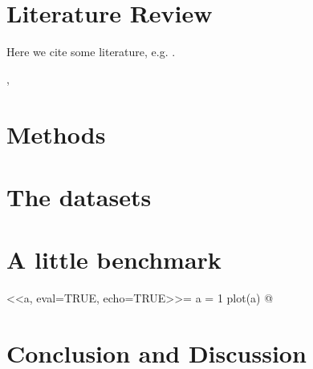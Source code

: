 \documentclass[a4paper]{article}
\begin{document}
\section{Literature Review}
\label{sec:literature}
  
Here we cite some literature, e.g. \citet{Bischl2017}.
  
  \citet{Olson2017},
  \citet{OpenML2013}

  


\section{Methods}

\section{The datasets}
 
\section{A little benchmark}

<<a, eval=TRUE, echo=TRUE>>=
  a = 1
  plot(a)
@

\section{Conclusion and Discussion}
\label{sec:conclusion}

\FloatBarrier


\end{document}
